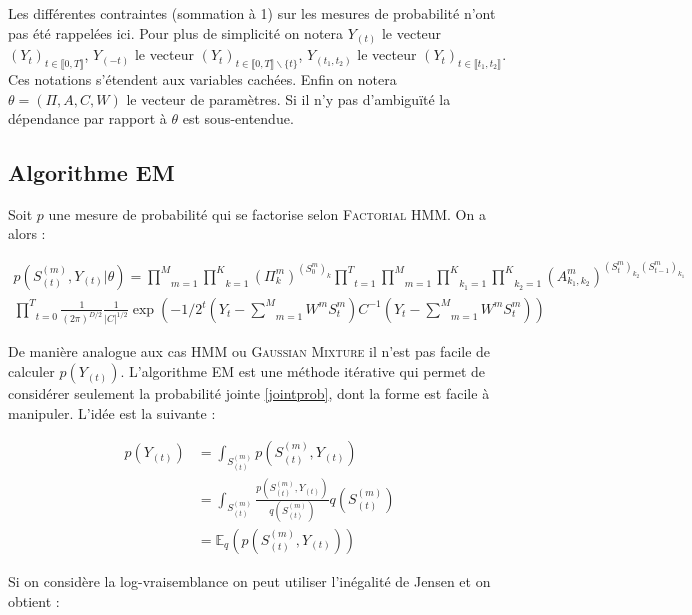 \documentclass[10pt,a4paper]{article}
\newcommand{\hmm}{\textsc{HMM}}
\newcommand{\fhmm}{\textsc{Factorial HMM}}
\newcommand{\EM}{\textsc{EM}}
\begin{document}
Les différentes contraintes (sommation à 1) sur les mesures de probabilité 
n'ont pas été rappelées ici. Pour plus de simplicité on notera $Y_{(t)}$ le 
vecteur $(Y_t)_{t \in \llbracket 0,T \rrbracket}$, $Y_{(-t)}$ le vecteur 
$(Y_{t})_{t \in \llbracket 0,T \rrbracket\backslash \lbrace t \rbrace}$, 
$Y_{(t_1,t_2)}$ le vecteur $(Y_t)_{t \in \llbracket t_1,t_2 \rrbracket}$. Ces 
notations s'étendent aux variables cachées. Enfin on notera $\theta=(\Pi, 
A,C,W)$ le vecteur de paramètres. Si il n'y pas d'ambiguïté la dépendance 
par rapport à $\theta$ est sous-entendue.

\subsection{Algorithme \EM{}\label{app:EM}}
Soit $p$ une mesure de probabilité qui se factorise selon \fhmm. On a alors :

\begin{multline}
p(S_{(t)}^{(m)},Y_{(t)} \vert 
\theta)=\underset{m=1}{\overset{M}{\prod}}\underset{k=1}{\overset{K}{\prod}}
(\Pi_k^m)^{(S_0^m)_k}\underset{t=1}{\overset{T}{\prod}}\underset{m=1}{\overset{M
}{\prod}}\underset{k_1=1}{\overset{K}{\prod}}\underset{k_2=1}{\overset{K}{\prod}
}(A_{k_1,k_2}^m)^{(S_t^m)_{k_2}(S_{t-1}^m)_{k_1}}\\ 
\underset{t=0}{\overset{T}{\prod}}\frac{1}{(2\pi)^{D/2}}\frac{1}{\vert C  
\vert^{1/2}}\exp\left(-1/2 {}^t\left(Y_t- \underset{m=1}{\overset{M}{\sum}}W^m 
S_t^m \right)C^{-1} \left(Y_t- \underset{m=1}{\overset{M}{\sum}}W^m S_t^m 
\right)\right) \label{jointprob}
\end{multline}

De manière analogue aux cas \hmm{} ou \textsc{Gaussian Mixture} il n'est pas 
facile de calculer $p(Y_{(t)})$.
L'algorithme \EM{} est une méthode itérative  qui permet de considérer
seulement la probabilité jointe \ref{jointprob}, dont la forme est facile à
manipuler. L'idée est la suivante :

\begin{equation}
\begin{aligned}
p(Y_{(t)})&=\int_{S_{(t)}^{(m)}}p(S_{(t)}^{(m)},Y_{(t)}) \\
&=\int_{S_{(t)}^{(m)}}\frac{p(S_{(t)}^{(m)},Y_{(t)})}{q(S_{(t)}^{(m)})}q(S_{(t)}
^{(m)}) \\
&=\mathbb{E}_q\left(p(S_{(t)}^{(m)},Y_{(t)}) \right)
\end{aligned}
\end{equation}

Si on considère la log-vraisemblance on peut utiliser l'inégalité de Jensen et 
on obtient :
\end{document}
